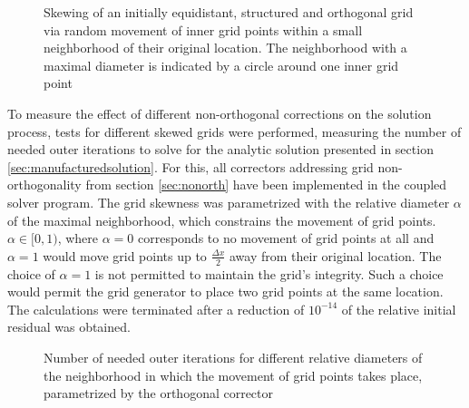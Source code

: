\begin{figure}[h!]
  \begin{center}
    
    \caption{Skewing of an initially equidistant, structured and orthogonal grid via random movement of inner grid points within a small neighborhood of their original location. The neighborhood with a maximal diameter is indicated by a circle around one inner grid point}
    \label{fig:nonorthgrid}
  \end{center}
\end{figure}

To measure the effect of different non-orthogonal corrections on the solution process, tests for different skewed grids were performed, measuring the number of needed outer iterations to solve for the analytic solution presented in section \ref{sec:manufacturedsolution}.  For this, all correctors addressing grid non-orthogonality from section \ref{sec:nonorth} have been implemented in the coupled solver program. The grid skewness was parametrized with the relative diameter \(\alpha\) of the maximal neighborhood, which constrains the movement of grid points. \(\alpha \in [0,1) \), where \(\alpha = 0\) corresponds to no movement of grid points at all and \(\alpha = 1\) would move grid points up to \(\textstyle \frac{\Delta x}{2} \) away from their original location. The choice of \(\alpha = 1\) is not permitted to maintain the grid's integrity. Such a choice would permit the grid generator to place two grid points at the same location. The calculations were terminated after a reduction of \(10^{-14}\) of the relative initial residual was obtained.

\begin{figure}
  \begin{center}
  \end{center}
\caption{Number of needed outer iterations for different relative diameters of the neighborhood in which the movement of grid points takes place, parametrized by the orthogonal corrector}
\label{fig:nonorth}
\end{figure}

